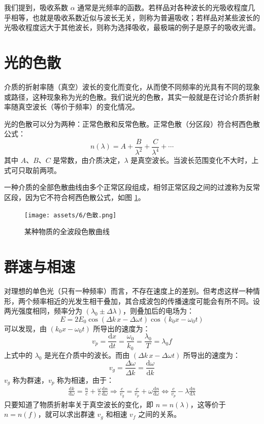 \documentclass[UTF8]{report}
\theoremstyle{MyLineTheoremStyle} %
\theoremstyle{MyBlockTheoremStyle} %
\theoremstyle{MySubsubsectionStyle} %
\begin{document}
我们提到，吸收系数 $\alpha$ 通常是光频率的函数。若样品对各种波长的光吸收程度几乎相等，也就是吸收系数近似与波长无关，则称为普遍吸收；若样品对某些波长的光吸收程度远大于其他波长，则称为选择吸收，最极端的例子是原子的吸收光谱。

\section{光的色散}
介质的折射率随（真空）波长的变化而变化，从而使不同频率的光具有不同的现象或路径，这种现象称为光的色散。我们说光的色散，其实一般就是在讨论介质折射率随真空波长（等价于频率）的变化情况。

光的色散可以分为两种：正常色散和反常色散。正常色散（分区段）符合柯西色散公式：
\begin{equation}
n(\lambda) = A + \frac{B}{\lambda^2} + \frac{C}{\lambda^4} + \cdots
\end{equation}
其中 $A$、$B$、$C$ 是常数，由介质决定，$\lambda$ 是真空波长。当波长范围变化不大时，上式可只取前两项。

一种介质的全部色散曲线由多个正常区段组成，相邻正常区段之间的过渡称为反常区段，因为它不符合柯西色散公式，如图 \ref{某种物质的全波段色散曲线}。
\begin{figure}[H]\centering
    \texttt{[image: assets/6/色散.png]}
    \caption{某种物质的全波段色散曲线}
    \label{某种物质的全波段色散曲线}
\end{figure}

\section{群速与相速}
对理想的单色光（只有一种频率）而言，不存在速度上的差别。但考虑这样一种情形，两个频率相近的光发生相干叠加，其合成波包的传播速度可能会有所不同。设两光强度相同，频率分为 $(\lambda_0 \pm \Delta \lambda)$，则叠加后的电场为：
\begin{equation}
E = 2 E_0 \cos \left(\Delta k \,x - \Delta \omega t\right) \cos \left(k_0x - \omega_0 t\right)
\end{equation}
可以发现，由 $(k_0x - \omega_0 t)$ 所导出的速度为：
\begin{equation}
v_p = \frac{\mathrm{d} x }{\mathrm{d} t }  = \frac{\omega_0}{k_0} = \frac{\lambda_0}{T} = \lambda_0 f
\end{equation}
上式中的 $\lambda_0$ 是光在介质中的波长。而由 $(\Delta k \,x - \Delta \omega t)$ 所导出的速度为：
\begin{equation}
v_g = \frac{\Delta \omega}{\Delta k} = \frac{\mathrm{d} \omega}{\mathrm{d} k}
\end{equation}
$v_g$ 称为群速，$v_p$ 称为相速，由于：
\begin{gather}
    \frac{\mathrm{d} k }{\mathrm{d} \omega } = \frac{n}{c} + \frac{\omega}{c} \frac{\mathrm{d} n }{\mathrm{d} \omega } \Longrightarrow 
    \frac{c}{v_g} = \frac{c}{v_p} + \omega \frac{\mathrm{d} n }{\mathrm{d} \omega } \Longleftrightarrow \frac{c}{v_p} - \lambda \frac{\mathrm{d} n }{\mathrm{d} \lambda }
\end{gather}
只要知道了物质折射率关于真空波长的变化，即 $n = n(\lambda)$，这等价于 $n = n(f)$，就可以求出群速 $v_g$ 和相速 $v_f$ 之间的关系。
\end{document}
